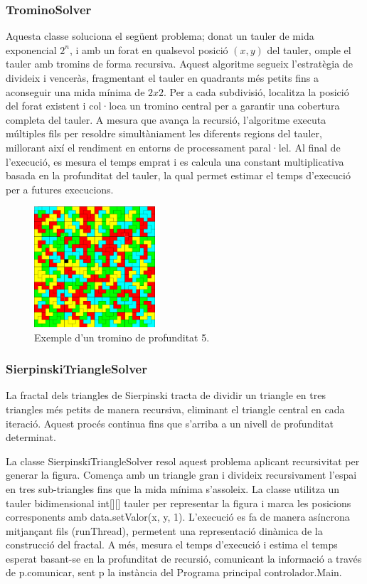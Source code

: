 \documentclass{ieeetj}
\begin{document}
\subsubsection{TrominoSolver}
Aquesta classe soluciona el següent problema; donat un tauler de mida exponencial \(2^n\), i amb un forat en qualsevol posició \((x,y)\) del tauler, omple el tauler amb tromins de forma recursiva.
Aquest algoritme segueix l'estratègia de divideix i venceràs, fragmentant el tauler en quadrants més petits fins a aconseguir una mida mínima de \(2x2\). Per a cada subdivisió, localitza la posició del forat existent i col·loca un tromino central per a garantir una cobertura completa del tauler. A mesura que avança la recursió, l'algoritme executa múltiples fils per resoldre simultàniament les diferents regions del tauler, millorant així el rendiment en entorns de processament paral·lel. Al final de l'execució, es mesura el temps emprat i es calcula una constant multiplicativa basada en la profunditat del tauler, la qual permet estimar el temps d'execució per a futures execucions.

\begin{figure}[htbp]
\centerline{\includegraphics[width=0.4\textwidth]{docs/png/FiguraTromino5.png}}
\caption{Exemple d'un tromino de profunditat 5.}
\label{fig:int2}
\end{figure}

\subsubsection{SierpinskiTriangleSolver}
La fractal dels triangles de Sierpinski tracta de dividir un triangle en tres triangles més petits de manera recursiva, eliminant el triangle central en cada iteració. Aquest procés continua fins que s'arriba a un nivell de profunditat determinat.

La classe SierpinskiTriangleSolver resol aquest problema aplicant recursivitat per generar la figura. Comença amb un triangle gran i divideix recursivament l'espai en tres sub-triangles fins que la mida mínima s'assoleix. La classe utilitza un tauler bidimensional int[][] tauler per representar la figura i marca les posicions corresponents amb data.setValor(x, y, 1). L'execució es fa de manera asíncrona mitjançant fils (runThread), permetent una representació dinàmica de la construcció del fractal. A més, mesura el temps d'execució i estima el temps esperat basant-se en la profunditat de recursió, comunicant la informació a través de p.comunicar, sent p la instància del Programa principal controlador.Main.
\end{document}
